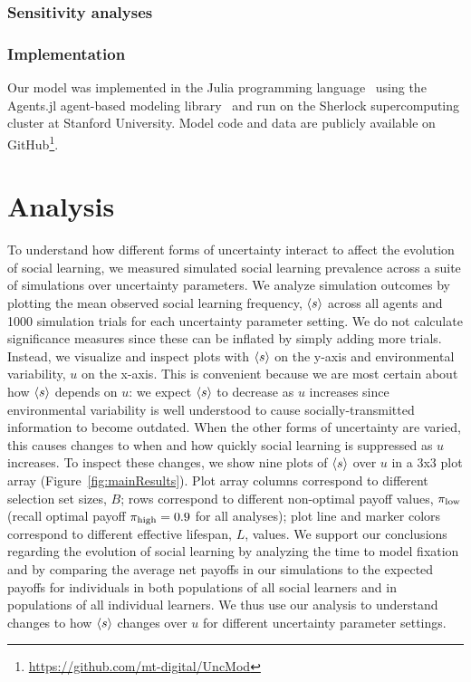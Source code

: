 \documentclass[letterpaper,11.5pt]{scrartcl}
\begin{document}
\subsubsection{Sensitivity analyses}




\subsubsection{Implementation}
Our model was implemented in the Julia programming language~\cite{Bezanson2017} 
using the Agents.jl agent-based modeling library~\cite{Datseris2022} and run
on the Sherlock supercomputing cluster at Stanford University. Model code and
data are publicly available on GitHub\footnote{\url{https://github.com/mt-digital/UncMod}}.


\section{Analysis}

To understand how different forms of uncertainty interact to affect the evolution
of social learning, we measured simulated social learning prevalence across a 
suite of simulations over uncertainty parameters. We analyze simulation outcomes
by plotting the mean observed social learning frequency, $\langle s \rangle$ across all agents 
and 1000 simulation trials for each uncertainty parameter setting. We do not calculate
significance measures since these can be inflated by simply adding more trials.
Instead, we visualize and inspect plots with $\langle s \rangle$ on the y-axis and
environmental variability, $u$ on the x-axis. This is convenient because we are
most certain about how $\langle s \rangle$ depends on $u$: we expect $\langle s \rangle$ to decrease
as $u$ increases since environmental variability is well understood to cause
socially-transmitted information to become outdated. When the other forms of
uncertainty are varied, this causes changes to when and how quickly social learning
is suppressed as $u$ increases. To inspect these changes, we show nine plots
of $\langle s \rangle$ over $u$ in a 3x3 plot array (Figure~\ref{fig:mainResults}). 
Plot array columns correspond to different selection set sizes, $B$; rows
correspond to different non-optimal payoff values, $\pi_{\mathrm{low}}$ (recall optimal
payoff $\pi_{\mathrm{high}}=0.9$ for all analyses); plot line and marker colors correspond
to different effective lifespan, $L$, values. 
We support our conclusions regarding the evolution of
social learning by analyzing the time to model 
fixation and by comparing the average net payoffs in our simulations to the
expected payoffs for individuals in both populations of all social learners
and in populations of all individual learners. We thus use our analysis 
to understand changes to how $\langle s \rangle$ changes over $u$ for different uncertainty parameter settings.
\end{document}
